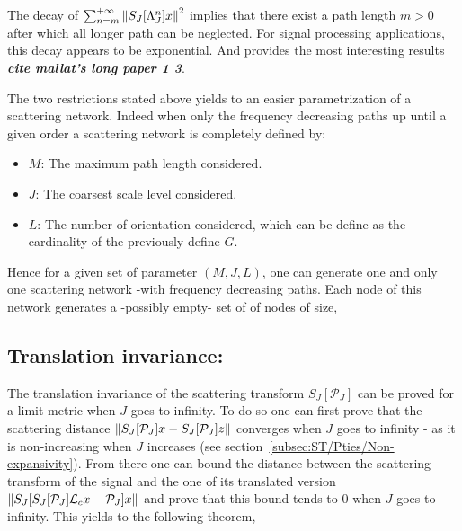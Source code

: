 \documentclass[a4paper,11pt]{report}
\begin{document}
{			The decay of $\sum_{n=m}^{+\infty} \left\lVert S_{J}[\Lambda_{J}^{n}]x \right\rVert^{2}$ implies that there exist a path length $m > 0$ after which all longer path can be neglected. For signal processing applications, this decay appears to be exponential. And  provides the most interesting results \textbf{\textit{cite mallat's long paper 1 3}}.
			
			The two restrictions stated above yields to an easier parametrization of a scattering network. Indeed when only the frequency decreasing paths up until a given order a scattering network is completely defined by:
			\begin{itemize}
			  \item $M$: The maximum path length considered.
			  \item $J$: The coarsest scale level considered.
			  \item $L$: The number of orientation considered, which can be define as the cardinality of the previously define $G$.
			\end{itemize}
			
			Hence for a given set of parameter $(M,J,L)$, one can generate one and only one scattering network -with frequency decreasing paths. Each node of this network generates a -possibly empty- set of of nodes of size,
			
			 
			
		\subsection{Translation invariance:}
			\label{subsec:ST/Pties/Translation}
			
			The translation invariance of the scattering transform $S_{J}[\mathcal{P}_{J}]$ can be proved for a limit metric when $J$ goes to infinity. To do so one can first prove that the scattering distance $\left\lVert S_{J}[\mathcal{P}_{J}]x - S_{J}[\mathcal{P}_{J}]z \right\rVert$ converges when $J$ goes to infinity - as it is non-increasing when $J$ increases (see section~\ref{subsec:ST/Pties/Non-expansivity}). From there one can bound the distance between the scattering transform of the signal and the one of its translated version $\left\lVert S_{J}[ S_{J}[\mathcal{P}_{J}]\mathcal{L}_{c}x - \mathcal{P}_{J}]x \right\rVert$ and prove that this bound tends to $0$ when $J$ goes to infinity. This yields to the following theorem,
			
}
\end{document}
